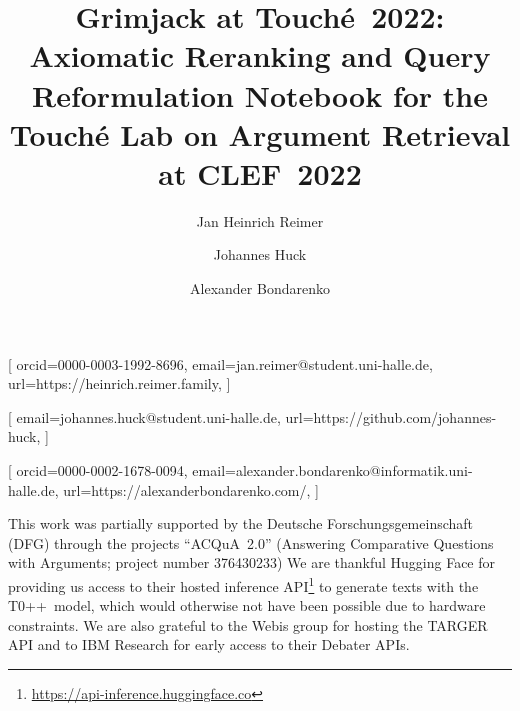 \documentclass{ceurart}
\begin{document}

\title{%
  Grimjack at \texorpdfstring{Touché~2022}{Touché 2022}:\texorpdfstring{\\}{ }
  Axiomatic Reranking and Query Reformulation%
}
\title[mode=sub]{%
  Notebook for the Touché Lab on Argument Retrieval at CLEF\ 2022%
}

\author{Jan Heinrich Reimer}[
  orcid=0000-0003-1992-8696,
  email=jan.reimer@student.uni-halle.de,
  url=https://heinrich.reimer.family,
]
\author{Johannes Huck}[
  email=johannes.huck@student.uni-halle.de,
  url=https://github.com/johannes-huck,
]
\author{Alexander Bondarenko}[
  orcid=0000-0002-1678-0094,
  email=alexander.bondarenko@informatik.uni-halle.de,
  url=https://alexanderbondarenko.com/,
]

\address{%
  Martin-Luther-Universität Halle-Wittenberg,
  06099~Halle~(Saale), Germany
}



\maketitle







\begin{acknowledgments}
This work was partially supported by the Deutsche Forschungsgemeinschaft (DFG) through the projects ``ACQuA~2.0'' (Answering Comparative Questions with Arguments; project number 376430233)
We are thankful Hugging Face for providing us access to their hosted inference API\footnote{\url{https://api-inference.huggingface.co}} to generate texts with the T0++~model, which would otherwise not have been possible due to hardware constraints. 
We are also grateful to the Webis group for hosting the TARGER API and to IBM Research for early access to their Debater APIs.
\end{acknowledgments}


\end{document}
